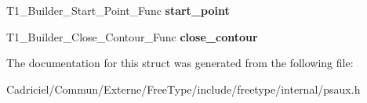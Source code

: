 \begin{DoxyCompactItemize}
\item 
T1\+\_\+\+Builder\+\_\+\+Start\+\_\+\+Point\+\_\+\+Func {\bfseries start\+\_\+point}\hypertarget{struct_t1___builder___funcs_rec___ab4897186c65875b4312d4ef68aad9d02}{}\label{struct_t1___builder___funcs_rec___ab4897186c65875b4312d4ef68aad9d02}

\item 
T1\+\_\+\+Builder\+\_\+\+Close\+\_\+\+Contour\+\_\+\+Func {\bfseries close\+\_\+contour}\hypertarget{struct_t1___builder___funcs_rec___abe163896432cc768719bf87cef0d1266}{}\label{struct_t1___builder___funcs_rec___abe163896432cc768719bf87cef0d1266}

\end{DoxyCompactItemize}


The documentation for this struct was generated from the following file\+:\begin{DoxyCompactItemize}
\item 
Cadriciel/\+Commun/\+Externe/\+Free\+Type/include/freetype/internal/psaux.\+h\end{DoxyCompactItemize}
